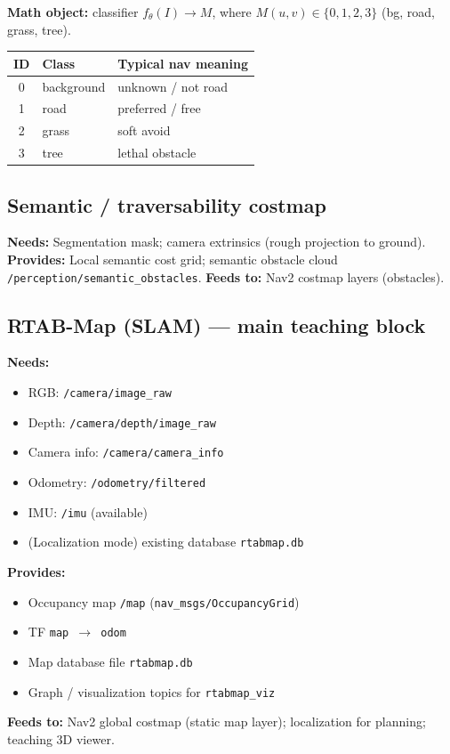 \documentclass[11pt,a4paper]{article}
\newcommand{\needs}[1]{\textbf{Needs:} #1}
\newcommand{\provides}[1]{\textbf{Provides:} #1}
\newcommand{\feeds}[1]{\textbf{Feeds to:} #1}
\begin{document}
\textbf{Math object:} classifier $f_\theta(I)\rightarrow M$, where $M(u,v)\in\{0,1,2,3\}$ (bg, road, grass, tree).

\begin{table}[h]
\centering
\begin{tabular}{@{}cll@{}}
\toprule
ID & Class & Typical nav meaning \\
\midrule
0 & background & unknown / not road \\
1 & road & preferred / free \\
2 & grass & soft avoid \\
3 & tree & lethal obstacle \\
\bottomrule
\end{tabular}
\end{table}

\subsection{Semantic / traversability costmap}
\needs{Segmentation mask; camera extrinsics (rough projection to ground).}
\provides{Local semantic cost grid; semantic obstacle cloud \texttt{/perception/semantic\_obstacles}.}
\feeds{Nav2 costmap layers (obstacles).}

\subsection{RTAB-Map (SLAM) --- main teaching block}
\needs{
\begin{itemize}[nosep,leftmargin=*]
  \item RGB: \texttt{/camera/image\_raw}
  \item Depth: \texttt{/camera/depth/image\_raw}
  \item Camera info: \texttt{/camera/camera\_info}
  \item Odometry: \texttt{/odometry/filtered}
  \item IMU: \texttt{/imu} (available)
  \item (Localization mode) existing database \texttt{rtabmap.db}
\end{itemize}}
\provides{
\begin{itemize}[nosep,leftmargin=*]
  \item Occupancy map \texttt{/map} (\texttt{nav\_msgs/OccupancyGrid})
  \item TF \texttt{map $\rightarrow$ odom}
  \item Map database file \texttt{rtabmap.db}
  \item Graph / visualization topics for \texttt{rtabmap\_viz}
\end{itemize}}
\feeds{Nav2 global costmap (static map layer); localization for planning; teaching 3D viewer.}
\end{document}
